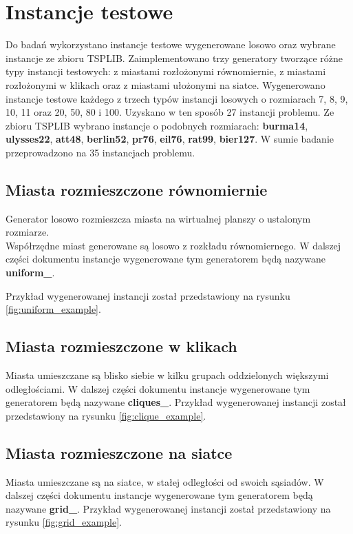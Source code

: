 \section{Instancje testowe} \label{section:instances}
Do badań wykorzystano instancje testowe wygenerowane losowo oraz wybrane instancje ze zbioru TSPLIB.
Zaimplementowano trzy generatory tworzące różne typy instancji testowych: z miastami rozłożonymi równomiernie,
z miastami rozłożonymi w klikach oraz z miastami ułożonymi na siatce.
Wygenerowano instancje testowe każdego z trzech typów instancji losowych o rozmiarach 7, 8, 9, 10, 11 oraz 20, 50, 80 i 100.
Uzyskano w ten sposób 27 instancji problemu.
Ze zbioru TSPLIB wybrano instancje o podobnych rozmiarach: \textbf{burma14}, \textbf{ulysses22}, \textbf{att48}, \textbf{berlin52}, \textbf{pr76}, \textbf{eil76}, \textbf{rat99},
\textbf{bier127}.
W sumie badanie przeprowadzono na 35 instancjach problemu.

\subsection*{Miasta rozmieszczone równomiernie}
Generator losowo rozmieszcza miasta na wirtualnej planszy o ustalonym rozmiarze.\\
Współrzędne miast generowane są losowo z rozkładu równomiernego.
W dalszej części dokumentu instancje wygenerowane tym generatorem będą nazywane \textbf{uniform\_<liczba miast>}.

Przykład wygenerowanej instancji został przedstawiony na rysunku \ref{fig:uniform_example}.

\subsection*{Miasta rozmieszczone w klikach}
Miasta umieszczane są blisko siebie w kilku grupach oddzielonych większymi odległościami.
W dalszej części dokumentu instancje wygenerowane tym generatorem będą nazywane \textbf{cliques\_<liczba miast>}.
Przykład wygenerowanej instancji został przedstawiony na rysunku \ref{fig:clique_example}.


\subsection*{Miasta rozmieszczone na siatce}
Miasta umieszczane są na siatce, w stałej odległości od swoich sąsiadów.
W dalszej części dokumentu instancje wygenerowane tym generatorem będą nazywane \textbf{grid\_<liczba miast>}.
Przykład wygenerowanej instancji został przedstawiony na rysunku \ref{fig:grid_example}.

